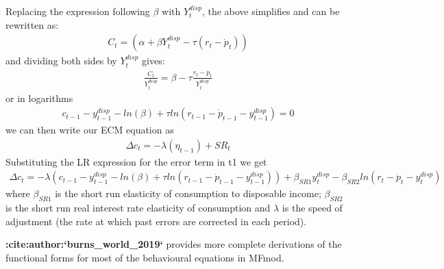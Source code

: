 \documentclass[letterpaper,10pt,english]{jupyterBook}
\begin{document}
\sphinxAtStartPar
Replacing the expression following \(\beta\) with \(Y^{disp}_t\), the above simplifies and can be rewritten as:
\begin{equation*}
\begin{split} C_t= (\alpha + \beta{Y^{disp}_t}-\tau(r_t-\dot{p}_t))\end{split}
\end{equation*}
\sphinxAtStartPar
and dividing both sides by \(Y^{disp}_t\) gives:
\begin{equation*}
\begin{split}\frac{C_t}{Y^{disp}_t} = \beta -\tau\frac{r_t-\dot{p}_t}{Y^{disp}_t}\end{split}
\end{equation*}
\sphinxAtStartPar
or in logarithms
\begin{equation*}
\begin{split}{c_{t-1}}-{y^{disp}_{t-1}} - ln(\beta) +\tau ln(r_{t-1}-\dot{p}_{t-1} -{y^{disp}_{t-1}})=0\end{split}
\end{equation*}
\sphinxAtStartPar
we can then write our ECM equation as
\begin{equation*}
\begin{split} \Delta c_t = -\lambda(\eta_{t-1})+ SR_t \end{split}
\end{equation*}
\sphinxAtStartPar
Substituting the LR expression for the error term in t\sphinxhyphen{}1 we get
\begin{equation*}
\begin{split} \Delta c_t = -\lambda({c_{t-1}}-{y^{disp}_{t-1}} - ln(\beta) +\tau ln(r_{t-1}-\dot{p}_{t-1} -{y^{disp}_{t-1}}))+ \beta_{SR1}{y^{disp}_{t}} - \beta_{SR2}ln(r_{t}-\dot{p}_{t} -{y^{disp}_{t}})  \end{split}
\end{equation*}
\sphinxAtStartPar
where \(\beta_{SR1}\) is the short run elasticity of consumption to disposable income; \(\beta_{SR2}\) is the short run real interest rate elasticity of consumption and \(\lambda\) is the speed of adjustment (the rate at which past errors are corrected in each period).

\sphinxAtStartPar
{\color{red}\bfseries{}:cite:author:`burns\_world\_2019`} provides more complete derivations of the functional forms for most of the behavioural equations in MFmod.

\sphinxstepscope
\end{document}
